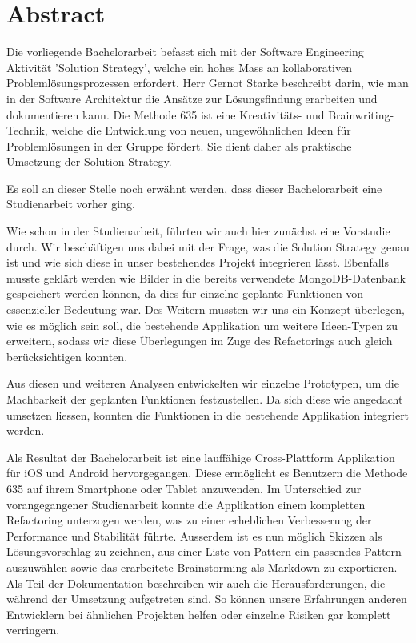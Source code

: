 \thispagestyle{empty}
\section*{Abstract}
Die vorliegende Bachelorarbeit befasst sich mit der Software Engineering Aktivität 'Solution Strategy', welche ein hohes Mass an kollaborativen Problemlösungsprozessen erfordert. Herr Gernot Starke beschreibt darin, wie man in der Software Architektur die Ansätze zur Lösungsfindung erarbeiten und dokumentieren kann. Die Methode 635 ist eine Kreativitäts- und Brainwriting-Technik, welche die Entwicklung von neuen, ungewöhnlichen Ideen für Problemlösungen in der Gruppe fördert. Sie dient daher als praktische Umsetzung der Solution Strategy.

Es soll an dieser Stelle noch erwähnt werden, dass dieser Bachelorarbeit eine Studienarbeit \cite{methode635-sa} vorher ging.

Wie schon in der Studienarbeit, führten wir auch hier zunächst eine Vorstudie durch. Wir beschäftigen uns dabei mit der Frage, was die Solution Strategy genau ist und wie sich diese in unser bestehendes Projekt integrieren lässt. Ebenfalls musste geklärt werden wie Bilder in die bereits verwendete MongoDB-Datenbank gespeichert werden können, da dies für einzelne geplante Funktionen von essenzieller Bedeutung war. Des Weitern mussten wir uns ein Konzept überlegen, wie es möglich sein soll, die bestehende Applikation um weitere Ideen-Typen zu erweitern, sodass wir diese Überlegungen im Zuge des Refactorings auch gleich berücksichtigen konnten. 

Aus diesen und weiteren Analysen entwickelten wir einzelne Prototypen, um die Machbarkeit der geplanten Funktionen festzustellen. Da sich diese wie angedacht umsetzen liessen, konnten die Funktionen in die bestehende Applikation integriert werden. 

Als Resultat der Bachelorarbeit ist eine lauffähige Cross-Plattform Applikation für iOS und Android hervorgegangen. Diese ermöglicht es Benutzern die Methode 635 auf ihrem Smartphone oder Tablet anzuwenden. Im Unterschied zur vorangegangener Studienarbeit konnte die Applikation einem kompletten Refactoring unterzogen werden, was zu einer erheblichen Verbesserung der Performance und Stabilität führte. Ausserdem ist es nun möglich Skizzen als Lösungsvorschlag zu zeichnen, aus einer Liste von Pattern ein passendes Pattern auszuwählen sowie das erarbeitete Brainstorming als Markdown zu exportieren. Als Teil der Dokumentation beschreiben wir auch die Herausforderungen, die während der Umsetzung aufgetreten sind. So können unsere Erfahrungen anderen Entwicklern bei ähnlichen Projekten helfen oder einzelne Risiken gar komplett verringern.   